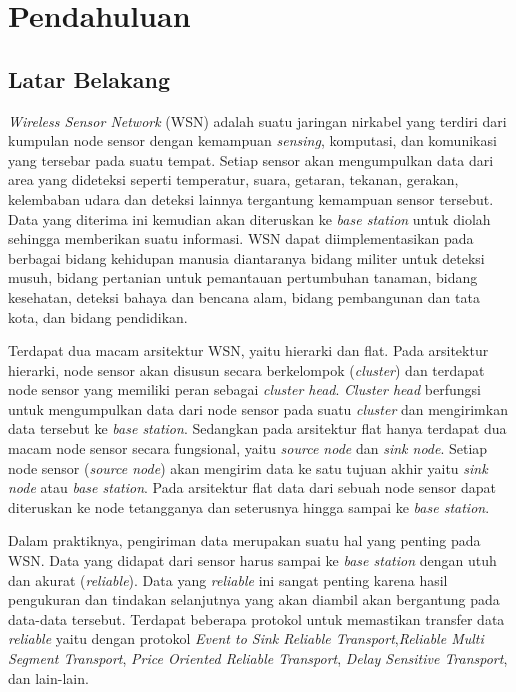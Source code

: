 \chapter{Pendahuluan}
\label{chap:intro}
   
\section{Latar Belakang}
\label{sec:label}

\textit{Wireless Sensor Network} (WSN) adalah suatu jaringan nirkabel yang terdiri dari kumpulan node sensor dengan kemampuan \textit{sensing}, komputasi, dan komunikasi yang tersebar pada suatu tempat. Setiap sensor akan mengumpulkan data dari area yang dideteksi seperti temperatur, suara, getaran, tekanan, gerakan, kelembaban udara dan deteksi lainnya tergantung kemampuan sensor tersebut. Data yang diterima ini kemudian akan diteruskan ke \textit{base station} untuk diolah sehingga memberikan suatu informasi. WSN dapat diimplementasikan pada berbagai bidang kehidupan manusia diantaranya bidang militer untuk deteksi musuh, bidang pertanian untuk pemantauan pertumbuhan tanaman, bidang kesehatan, deteksi bahaya dan bencana alam, bidang pembangunan dan tata kota, dan bidang pendidikan.

Terdapat dua macam arsitektur WSN, yaitu hierarki dan flat. Pada arsitektur hierarki, node sensor akan disusun secara berkelompok (\textit{cluster}) dan terdapat node sensor yang memiliki peran sebagai \textit{cluster head}. \textit{Cluster head} berfungsi untuk mengumpulkan data dari node sensor pada suatu \textit{cluster} dan mengirimkan data tersebut ke \textit{base station}. Sedangkan pada arsitektur flat hanya terdapat dua macam node sensor secara fungsional, yaitu \textit{source node} dan \textit{sink node}. Setiap node sensor (\textit{source node}) akan mengirim data ke satu tujuan akhir yaitu \textit{sink node} atau \textit{base station}. Pada arsitektur flat data dari sebuah node sensor dapat diteruskan ke node tetangganya dan seterusnya hingga sampai ke \textit{base station}.

Dalam praktiknya, pengiriman data merupakan suatu hal yang penting pada WSN. Data yang didapat dari sensor harus sampai ke \textit{base station} dengan utuh dan akurat (\textit{reliable}). Data yang \textit{reliable} ini sangat penting karena hasil pengukuran dan tindakan selanjutnya yang akan diambil akan bergantung pada data-data tersebut. Terdapat beberapa protokol untuk memastikan transfer data \textit{reliable} yaitu dengan protokol \textit{Event to Sink Reliable Transport},\textit{Reliable Multi Segment Transport}, \textit{Price Oriented Reliable Transport}, \textit{Delay Sensitive Transport}, dan lain-lain.

